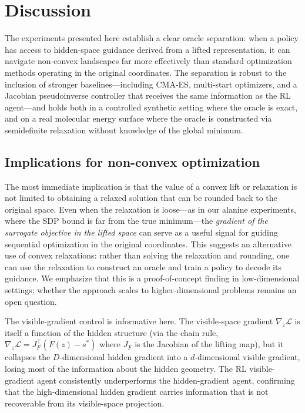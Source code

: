 \documentclass[10pt]{article}
\theoremstyle{definition}
\begin{document}
\section{Discussion}

The experiments presented here establish a clear oracle separation: when a policy has access to hidden-space guidance derived from a lifted representation, it can navigate non-convex landscapes far more effectively than standard optimization methods operating in the original coordinates. The separation is robust to the inclusion of stronger baselines---including CMA-ES, multi-start optimizers, and a Jacobian pseudoinverse controller that receives the same information as the RL agent---and holds both in a controlled synthetic setting where the oracle is exact, and on a real molecular energy surface where the oracle is constructed via semidefinite relaxation without knowledge of the global minimum.

\subsection{Implications for non-convex optimization}

The most immediate implication is that the value of a convex lift or relaxation is not limited to obtaining a relaxed solution that can be rounded back to the original space. Even when the relaxation is loose---as in our alanine experiments, where the SDP bound is far from the true minimum---the \emph{gradient of the surrogate objective in the lifted space} can serve as a useful signal for guiding sequential optimization in the original coordinates. This suggests an alternative use of convex relaxations: rather than solving the relaxation and rounding, one can use the relaxation to construct an oracle and train a policy to decode its guidance. We emphasize that this is a proof-of-concept finding in low-dimensional settings; whether the approach scales to higher-dimensional problems remains an open question.

The visible-gradient control is informative here. The visible-space gradient $\nabla_z \mathcal{L}$ is itself a function of the hidden structure (via the chain rule, $\nabla_z \mathcal{L} = J_F^\top(F(z) - s^*)$ where $J_F$ is the Jacobian of the lifting map), but it collapses the $D$-dimensional hidden gradient into a $d$-dimensional visible gradient, losing most of the information about the hidden geometry. The RL visible-gradient agent consistently underperforms the hidden-gradient agent, confirming that the high-dimensional hidden gradient carries information that is not recoverable from its visible-space projection.
\end{document}
